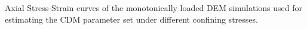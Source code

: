 \label{fig:fitted1} Axial Stress-Strain curves of the monotonically loaded DEM simulations used for estimating the CDM parameter set under different confining stresses.